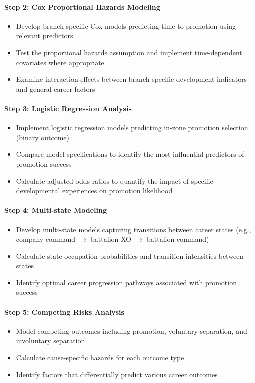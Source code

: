\documentclass[../main.tex]{subfiles}
\begin{document}
\paragraph{Step 2: Cox Proportional Hazards Modeling}
\begin{itemize}
\item Develop branch-specific Cox models predicting time-to-promotion using relevant predictors
\item Test the proportional hazards assumption and implement time-dependent covariates where appropriate
\item Examine interaction effects between branch-specific development indicators and general career factors
\end{itemize}

\paragraph{Step 3: Logistic Regression Analysis}
\begin{itemize}
\item Implement logistic regression models predicting in-zone promotion selection (binary outcome)
\item Compare model specifications to identify the most influential predictors of promotion success
\item Calculate adjusted odds ratios to quantify the impact of specific developmental experiences on promotion likelihood
\end{itemize}

\paragraph{Step 4: Multi-state Modeling}
\begin{itemize}
\item Develop multi-state models capturing transitions between career states (e.g., company command $\rightarrow$ battalion XO $\rightarrow$ battalion command)
\item Calculate state occupation probabilities and transition intensities between states
\item Identify optimal career progression pathways associated with promotion success
\end{itemize}

\paragraph{Step 5: Competing Risks Analysis}
\begin{itemize}
\item Model competing outcomes including promotion, voluntary separation, and involuntary separation
\item Calculate cause-specific hazards for each outcome type
\item Identify factors that differentially predict various career outcomes
\end{itemize}
\end{document}
